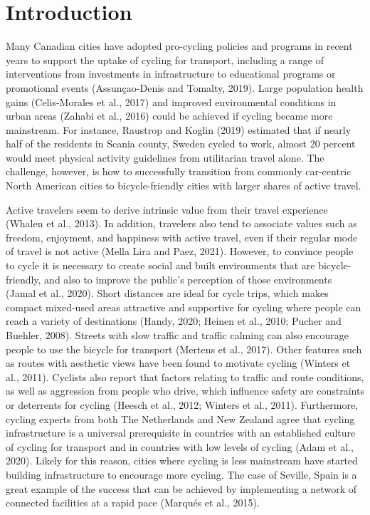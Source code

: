 \documentclass[]{elsarticle} %
\begin{document}
\newpage

\hypertarget{sec:introduction}{%
\section{Introduction}\label{sec:introduction}}

Many Canadian cities have adopted pro-cycling policies and programs in
recent years to support the uptake of cycling for transport, including a
range of interventions from investments in infrastructure to educational
programs or promotional events (Assunçao-Denis and Tomalty, 2019). Large
population health gains (Celis-Morales et al., 2017) and improved
environmental conditions in urban areas (Zahabi et al., 2016) could be
achieved if cycling became more mainstream. For instance, Raustrop and
Koglin (2019) estimated that if nearly half of the residents in Scania
county, Sweden cycled to work, almost 20 percent would meet physical
activity guidelines from utilitarian travel alone. The challenge,
however, is how to successfully transition from commonly car-centric
North American cities to bicycle-friendly cities with larger shares of
active travel.

Active travelers seem to derive intrinsic value from their travel
experience (Whalen et al., 2013). In addition, travelers also tend to
associate values such as freedom, enjoyment, and happiness with active
travel, even if their regular mode of travel is not active (Mella Lira
and Paez, 2021). However, to convince people to cycle it is necessary to
create social and built environments that are bicycle-friendly, and also
to improve the public's perception of those environments (Jamal et al.,
2020). Short distances are ideal for cycle trips, which makes compact
mixed-used areas attractive and supportive for cycling where people can
reach a variety of destinations (Handy, 2020; Heinen et al., 2010;
Pucher and Buehler, 2008). Streets with slow traffic and traffic calming
can also encourage people to use the bicycle for transport (Mertens et
al., 2017). Other features such as routes with aesthetic views have been
found to motivate cycling (Winters et al., 2011). Cyclists also report
that factors relating to traffic and route conditions, as well as
aggression from people who drive, which influence safety are constraints
or deterrents for cycling (Heesch et al., 2012; Winters et al., 2011).
Furthermore, cycling experts from both The Netherlands and New Zealand
agree that cycling infrastructure is a universal prerequisite in
countries with an established culture of cycling for transport and in
countries with low levels of cycling (Adam et al., 2020). Likely for
this reason, cities where cycling is less mainstream have started
building infrastructure to encourage more cycling. The case of Seville,
Spain is a great example of the success that can be achieved by
implementing a network of connected facilities at a rapid pace (Marqués
et al., 2015).
\end{document}
